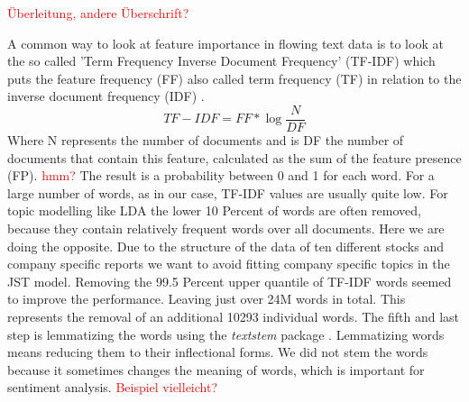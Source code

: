 \textcolor{red}{Überleitung, andere Überschrift?}



A common way to look at feature importance in flowing text data is to look at the so called 'Term Frequency Inverse Document Frequency' (TF-IDF) which puts the feature frequency (FF) also called term frequency (TF) in relation to the inverse document frequency (IDF) \citep{na2004effectiveness}. 
\begin{equation}
    TF-IDF = FF * \log{\frac{N}{DF}}
\end{equation} 
Where N represents the number of documents and is DF the number of documents that contain this feature, calculated as the sum of the feature presence (FP). \textcolor{red}{hmm?}
The result is a probability between 0 and 1 for each word. For a large number of words, as in our case, TF-IDF values are usually quite low. For topic modelling like LDA the lower 10 Percent of words are often removed, because they contain relatively frequent words over all documents. Here we are doing the opposite. Due to the structure of the data of ten different stocks and company specific reports we want to avoid fitting company specific topics in the JST model. Removing the 99.5 Percent upper quantile of TF-IDF words seemed to improve the performance. Leaving just over 24M words in total. This represents the removal of an additional 10293 individual words. The fifth and last step is lemmatizing the words using the \textit{textstem} package \citep{textstem}. Lemmatizing words means reducing them to their inflectional forms. We did not stem the words because it sometimes changes the meaning of words, which is important for sentiment analysis. \textcolor{red}{Beispiel vielleicht?}\\ \\



